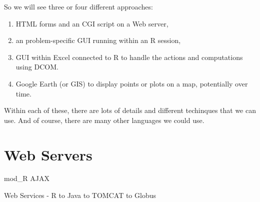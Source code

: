 So we will see three or four different approaches:
\begin{enumerate}
\item HTML forms and an CGI script on a Web server,
\item an problem-specific GUI running within an R session,
\item GUI within Excel connected to R to handle the actions and computations using DCOM.
\item Google Earth (or GIS) to display points or plots on a map,
  potentially over time.
\end{enumerate}
Within each of these, there are lots of details
and different techinques that we can use.
And of course, there are many other languages we could use.




\section{Web Servers}
mod_R
AJAX 

Web Services - R to  Java to TOMCAT to Globus

